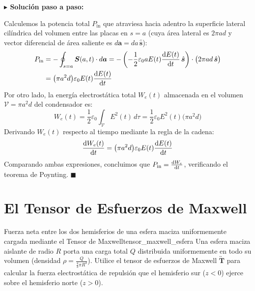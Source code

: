\documentclass[11pt,a4paper]{book}
\newenvironment{solucion}{%
    \par\medskip\noindent\textbf{\color{blue!65!black}\Large $\blacktriangleright$ Solución paso a paso:}\par\medskip
}{%
    \hfill$\blacksquare$\par\bigskip
}
\newcommand{\shat}{\hat{\bm{s}}}
\newcommand{\Svec}{\bm{S}}
\begin{document}
\begin{solucion}
Calculemos la potencia total $P_{\text{in}}$ que atraviesa hacia adentro la superficie lateral cilíndrica del volumen entre las placas en $s = a$ (cuya área lateral es $2\pi a d$ y vector diferencial de área saliente es $d\bm{a} = da\,\shat$):
\begin{align}
    P_{\text{in}} &= -\oint_{s=a} \Svec(a,t) \cdot d\bm{a} = -\left( -\frac{1}{2}\varepsilon_0 a E(t) \dv{E(t)}{t}\,\shat \right) \cdot \big( 2\pi a d \,\shat \big) \nonumber \\
    &= \big(\pi a^2 d\big) \varepsilon_0 E(t) \dv{E(t)}{t}
\end{align}
Por otro lado, la energía electrostática total $W_e(t)$ almacenada en el volumen $\mathcal{V} = \pi a^2 d$ del condensador es:
\begin{equation}
    W_e(t) = \frac{1}{2}\varepsilon_0 \int_{\mathcal{V}} E^2(t)\,d\tau = \frac{1}{2}\varepsilon_0 E^2(t) \big(\pi a^2 d\big)
\end{equation}
Derivando $W_e(t)$ respecto al tiempo mediante la regla de la cadena:
\begin{equation}
    \dv{W_e(t)}{t} = \big(\pi a^2 d\big) \varepsilon_0 E(t) \dv{E(t)}{t}
\end{equation}
Comparando ambas expresiones, concluimos que $P_{\text{in}} = \dv{W_e}{t}$, verificando el teorema de Poynting.
\end{solucion}

\section{El Tensor de Esfuerzos de Maxwell}

\begin{ejercicio}{Fuerza neta entre los dos hemisferios de una esfera maciza uniformemente cargada mediante el Tensor de Maxwell}{tensor_maxwell_esfera}
Una esfera maciza aislante de radio $R$ porta una carga total $Q$ distribuida uniformemente en todo su volumen (densidad $\rho = \frac{Q}{\frac{4}{3}\pi R^3}$). Utilice el tensor de esfuerzos de Maxwell $\overleftrightarrow{\bm{T}}$ para calcular la fuerza electrostática de repulsión que el hemisferio sur ($z < 0$) ejerce sobre el hemisferio norte ($z > 0$).
\end{ejercicio}
\end{document}
